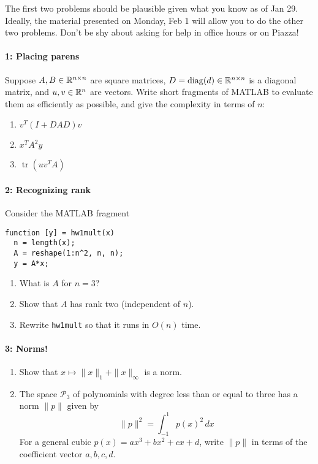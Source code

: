 \documentclass[12pt, leqno]{article}
\begin{document}

The first two problems should be plausible given what you know as of
Jan 29.  Ideally, the material presented on Monday, Feb 1 will allow
you to do the other two problems.  Don't be shy about asking for help
in office hours or on Piazza!

\paragraph*{1: Placing parens}
Suppose $A, B \in \mathbb{R}^{n \times n}$ are square matrices,
$D = \operatorname{diag}(d) \in \mathbb{R}^{n \times n}$ is a diagonal matrix,
and $u, v \in \mathbb{R}^n$ are vectors.  Write short
fragments of MATLAB to evaluate them as efficiently
as possible, and give the complexity in terms of $n$:
\begin{enumerate}
\item $v^T (I + D A D) v$
\item $x^T A^2 y$
\item $\operatorname{tr}(uv^T A)$
\end{enumerate}

\paragraph*{2: Recognizing rank}
Consider the MATLAB fragment

\lstset{language=matlab,frame=lines,columns=flexible}
\begin{lstlisting}
function [y] = hw1mult(x)
  n = length(x);
  A = reshape(1:n^2, n, n);
  y = A*x;
\end{lstlisting}

\begin{enumerate}
\item What is $A$ for $n = 3$?
\item Show that $A$ has rank two (independent of $n$).
\item Rewrite {\tt hw1mult} so that it runs in $O(n)$ time.
\end{enumerate}

\paragraph*{3: Norms!}
\begin{enumerate}
\item
  Show that $x \mapsto \|x\|_1 + \|x\|_\infty$ is a norm.
\item
  The space $\mathcal{P}_3$ of polynomials with degree less than or
  equal to three has a norm $\|p\|$ given by
  \[
    \|p\|^2 = \int_{-1}^1 p(x)^2 \, dx
  \]
  For a general cubic $p(x) = ax^3 + bx^2 + cx + d$, write $\|p\|$
  in terms of the coefficient vector $a, b, c, d$.
\end{enumerate}
\end{document}
